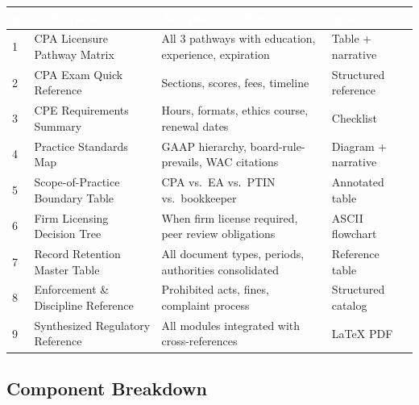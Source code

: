 \documentclass[11pt,letterpaper]{article}
\newcommand{\tableheader}[1]{\textbf{\sffamily\textcolor{white}{#1}}}
\begin{document}
\begin{center}
\begin{tabularx}{\textwidth}{C{0.5cm}L{3.5cm}XL{3cm}}
\toprule
{}
\tableheader{\#} & \tableheader{Deliverable} & \tableheader{Acceptance Criteria} & \tableheader{Spec} \\
 & CPA Licensure Pathway Matrix & All 3 pathways with education, experience, expiration & Table + narrative \\
2 & CPA Exam Quick Reference & Sections, scores, fees, timeline & Structured reference \\
3 & CPE Requirements Summary & Hours, formats, ethics course, renewal dates & Checklist \\
4 & Practice Standards Map & GAAP hierarchy, board-rule-prevails, WAC citations & Diagram + narrative \\
5 & Scope-of-Practice Boundary Table & CPA vs.\ EA vs.\ PTIN vs.\ bookkeeper & Annotated table \\
6 & Firm Licensing Decision Tree & When firm license required, peer review obligations & ASCII flowchart \\
7 & Record Retention Master Table & All document types, periods, authorities consolidated & Reference table \\
8 & Enforcement \& Discipline Reference & Prohibited acts, fines, complaint process & Structured catalog \\
9 & Synthesized Regulatory Reference & All modules integrated with cross-references & LaTeX PDF \\
\bottomrule
\end{tabularx}
\end{center}

\subsection{Component Breakdown}
\end{document}
